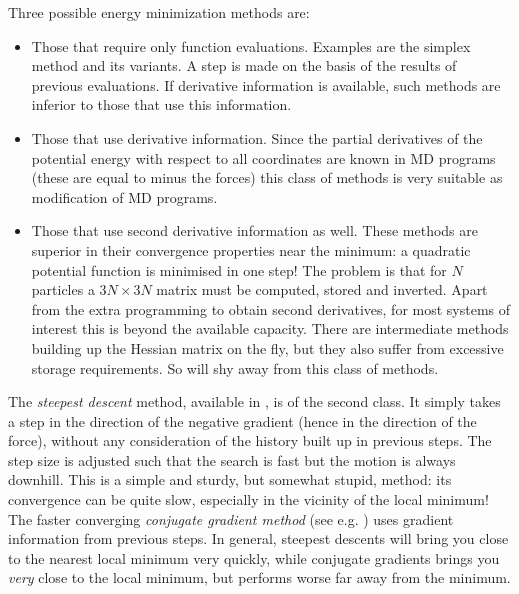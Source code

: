 Three possible energy minimization methods are:
\begin{itemize}
\item   Those that require only function evaluations. Examples are the 
        simplex method and its variants. A step is made on the basis of the 
        results of previous evaluations. If derivative information is 
        available, such methods are inferior to those that use 
        this information.
\item   Those that use derivative information. Since the partial 
        derivatives of the potential energy with respect to all 
        coordinates are known in MD programs (these are equal to minus 
        the forces) this class of methods is very suitable as modification 
        of MD programs.
\item   Those that use second derivative information as well. These methods 
        are superior in their convergence properties near the minimum: a 
        quadratic potential function is minimised in one step! The problem 
        is that for $N$ particles a $3N\times 3N$ matrix must be computed, 
        stored and inverted. Apart from the extra programming to obtain 
        second derivatives, for most systems of interest this is beyond the 
        available capacity. There are intermediate methods building up the 
        Hessian matrix on the fly, but they also suffer from excessive 
        storage requirements. So {\gromacs} will shy away from this class 
        of methods.
\end{itemize}


The {\em steepest descent} method, available in {\gromacs}, is of the
second class. It simply takes a step in the direction of the negative
gradient (hence in the direction of the force), without any
consideration of the history built up in previous steps. The step size
is adjusted such that the search is fast but the motion is always
downhill. This is a simple and sturdy, but somewhat stupid, method:
its convergence can be quite slow, especially in the vicinity of the
local minimum! The faster converging {\em conjugate gradient method}
(see e.g. \cite{Zimmerman91}) uses gradient information from previous
steps. In general, steepest descents will bring you close to the
nearest local minimum very quickly, while conjugate gradients brings
you {\em very} close to the local minimum, but performs worse far away
from the minimum.
